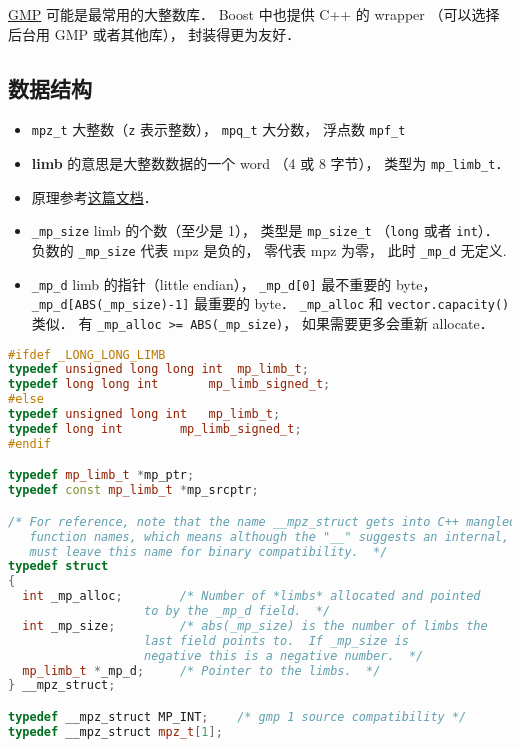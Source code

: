 
\href{https://gmplib.org/}{GMP} 可能是最常用的大整数库． Boost 中也提供 C++ 的 wrapper （可以选择后台用 GMP 或者其他库）， 封装得更为友好．

\subsection{数据结构}
\begin{itemize}
\item \verb|mpz_t| 大整数（\verb|z| 表示整数）， \verb|mpq_t| 大分数， 浮点数 \verb|mpf_t|
\item \textbf{limb} 的意思是大整数数据的一个 word （4 或 8 字节）， 类型为 \verb|mp_limb_t|．
\item 原理参考\href{https://gmplib.org/manual/Integer-Internals#Integer-Internals}{这篇文档}．
\item \verb|_mp_size| limb 的个数（至少是 1）， 类型是 \verb|mp_size_t| （\verb|long| 或者 \verb|int|）． 负数的 \verb|_mp_size| 代表 mpz 是负的， 零代表 mpz 为零， 此时 \verb|_mp_d| 无定义.
\item \verb|_mp_d| limb 的指针（little endian）， \verb|_mp_d[0]| 最不重要的 byte， \verb|_mp_d[ABS(_mp_size)-1]| 最重要的 byte．
\verb|_mp_alloc| 和 \verb|vector.capacity()| 类似． 有 \verb|_mp_alloc >= ABS(_mp_size)|， 如果需要更多会重新 allocate．
\end{itemize}

\begin{lstlisting}[language=cpp]
#ifdef _LONG_LONG_LIMB
typedef unsigned long long int	mp_limb_t;
typedef long long int		mp_limb_signed_t;
#else
typedef unsigned long int	mp_limb_t;
typedef long int		mp_limb_signed_t;
#endif

typedef mp_limb_t *mp_ptr;
typedef const mp_limb_t *mp_srcptr;

/* For reference, note that the name __mpz_struct gets into C++ mangled
   function names, which means although the "__" suggests an internal, we
   must leave this name for binary compatibility.  */
typedef struct
{
  int _mp_alloc;		/* Number of *limbs* allocated and pointed
				   to by the _mp_d field.  */
  int _mp_size;			/* abs(_mp_size) is the number of limbs the
				   last field points to.  If _mp_size is
				   negative this is a negative number.  */
  mp_limb_t *_mp_d;		/* Pointer to the limbs.  */
} __mpz_struct;

typedef __mpz_struct MP_INT;    /* gmp 1 source compatibility */
typedef __mpz_struct mpz_t[1];
\end{lstlisting}
